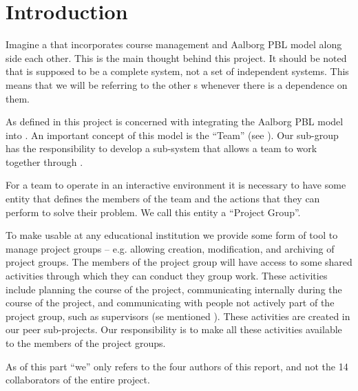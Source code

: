 \chapter{Introduction}
\label{chap:introProjectgroup}
Imagine a \moodle{} that incorporates course management and Aalborg PBL model along side each other.
This is the main thought behind this project.
It should be noted that \system{} is supposed to be a complete system, not a set of independent systems.
This means that we will be referring to the other \subsystem{}s whenever there is a dependence on them.



As defined in  this project is concerned with integrating the Aalborg PBL model into \moodle.
An important concept of this model is the ``Team'' (see ).
Our sub-group has the responsibility to develop a sub-system that allows a team to work together through \moodle.



For a team to operate in an interactive environment it is necessary to have some entity that defines the members of the team and the actions that they can perform to solve their problem.
We call this entity a ``Project Group''.



To make \system{} usable at any educational institution we provide some form of tool to manage project groups -- e.g. allowing  creation, modification, and archiving of project groups.
The members of the project group will have access to some shared activities through which they can conduct they group work.
These activities include planning the course of the project, communicating internally during the course of the project, and communicating with people not actively part of the project group, such as supervisors (se mentioned ).
These activities are created in our peer sub-projects.
Our responsibility is to make all these activities available to the members of the project groups.



As of this part ``we'' only refers to the four authors of this report, and not the 14 collaborators of the entire project.
